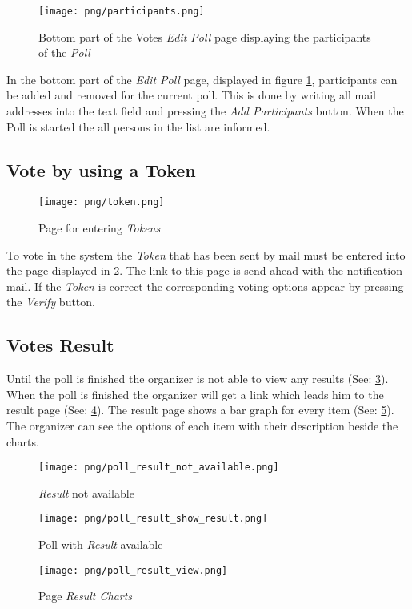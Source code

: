 \begin{figure}
\centering
\texttt{[image: png/participants.png]}
\caption{Bottom part of the Votes \textit{Edit Poll} page displaying the participants of the \textit{Poll}}
\label{F:participants}
\end{figure}

In the bottom part of the \textit{Edit Poll} page, displayed in figure \ref*{F:participants}, participants can be added and removed for the current poll. This is done by writing all mail addresses into the text field and pressing the \textit{Add Participants} button. When the Poll is started the all persons in the list are informed.

\subsection{Vote by using a Token}

\begin{figure}
\centering
\texttt{[image: png/token.png]}
\caption{Page for entering \textit{Tokens}}
\label{F:token}
\end{figure}

To vote in the system the \textit{Token} that has been sent by mail must be entered into the page displayed in \ref{F:token}. The link to this page is send ahead with the notification mail. If the \textit{Token} is correct the corresponding voting options appear by pressing the \textit{Verify} button.

\subsection{Votes Result}

Until the poll is finished the organizer is not able to view any results (See: \ref{F:not_available}).
When the poll is finished the organizer will get a link which leads him to the result page (See: \ref{F:show_result}).
The result page shows a bar graph for every item (See: \ref{F:result_charts}). The organizer can see the options of each item with their description beside the charts.

\begin{figure}
\centering
\texttt{[image: png/poll\_result\_not\_available.png]}
\caption{\textit{Result} not available }
\label{F:not_available}
\end{figure}


\begin{figure}
\centering
\texttt{[image: png/poll\_result\_show\_result.png]}
\caption{Poll with \textit{Result} available}
\label{F:show_result}
\end{figure}


\begin{figure}
\centering
\texttt{[image: png/poll\_result\_view.png]}
\caption{Page \textit{Result Charts}}
\label{F:result_charts}
\end{figure}









